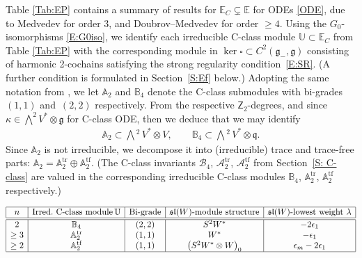 \documentclass[10pt,a4paper]{amsart}
\newcommand\tensor{\otimes}
\DeclareMathOperator{\tf}{tf}
\DeclareMathOperator{\tr}{tr}
\newcommand{\g}{\mathfrak{g}}
\newcommand\fg{\mathfrak{g}}
\newcommand\fsl{\mathfrak{sl}}
\newcommand\fq {\mathfrak{q}}
\newcommand\bbE{\mathbb{E}}
\newcommand\bbU{\mathbb{U}}
\newcommand\bbA{\mathbb{A}}
\newcommand\bbB{\mathbb{B}}
\newcommand\sfZ{\mathsf{Z}}
\newcommand\cA{\mathcal{A}}
\newcommand\cB{\mathcal{B}}
\numberwithin{equation}{section}
\begin{document}
Table \ref{Tab:EP} contains a summary of results for $\bbE_C \subsetneq \bbE$ for ODEs \eqref{ODE}, due to Medvedev \cite{Medvedev2010,Medvedev2011} for order $3$, and Doubrov--Medvedev \cite{DM2014} for order $\ge 4$. Using the $G_0$-isomorphisms \eqref{E:G0iso}, we identify each irreducible C-class module $\bbU \subset \bbE_C$ from Table \ref{Tab:EP} with the corresponding module in $\ker\square \subset C^2(\g_-,\g)$ consisting of harmonic 2-cochains satisfying the strong regularity con\-di\-tion~\eqref{E:SR}. (A further condition is formulated in Section~\ref{S:Ef} below.) Adopting the same notation from \cite[Table 6]{KT2021}, we let $\bbA_2$ and $\bbB_4$ denote the C-class submodules with bi-grades~$(1,1)$ and~$(2,2)$ respectively. From the respective $\sfZ_2$-degrees, and since $\kappa \in \bigwedge^2 V^* \otimes \fg$ for C-class ODE, then we deduce that we may identify
 \begin{align} \label{E:A2B4}
 \bbA_2 \subset \bigwedge{\!}^2\, V^* \otimes V, \qquad \bbB_4 \subset \bigwedge{\!}^2\, V^* \otimes \fq.
 \end{align}
Since $\bbA_2$ is not irreducible, we decompose it into (irreducible) trace and trace-free parts: $\bbA_2 = \bbA_2^{\tr} \oplus \bbA_2^{\tf}$. (The C-class invariants $\cB_4$, $\cA_2^{\tr}$, $\cA_2^{\tf}$ from Section~\ref{S: C-class} are valued in the corresponding irreducible C-class modules $\bbB_4$, $\bbA_2^{\tr}$, $\bbA_2^{\tf}$ respectively.)

 \begin{table}[h]\renewcommand{\arraystretch}{1.2}
 \centering
 $\begin{array}{|c|c|c|c|c|} \hline
 n & \text{Irred.\ C-class module}\, \bbU & \text{Bi-grade} & \fsl(W)\text{-module structure} & \fsl(W) \text{-lowest weight } \lambda\\ \hline\hline
 2 & \bbB_4 & (2,2) & S^2 W^{\ast} & -2\epsilon_1\\	
 \geq 3 & \bbA_2^{\tr} & (1,1) & W^{\ast} & -\epsilon_1\\	
 \ge 2 & \bbA_2^{\tf} & (1,1) & \bigl(S^2 W^{\ast}\tensor W\bigr)_0 & \epsilon_m - 2\epsilon_1\\\hline
 \end{array}$
 \caption{C-class modules in $\bbE_C \subsetneq \bbE \subsetneq H^2_{+}(\g_{-},\g)$ for vector ODEs of order $n+1 \geq 3$.}
 \label{Tab:EP}
 \end{table}
\end{document}
